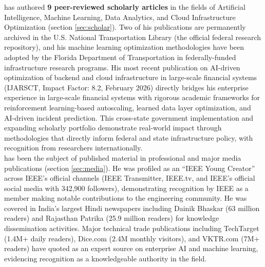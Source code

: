 \dr has authored \textbf{9 peer-reviewed scholarly articles} in the fields of Artificial Intelligence, Machine Learning, Data Analytics, and Cloud Infrastructure Optimization (section \ref{sec:scholar}). Two of his publications are permanently archived in the U.S. National Transportation Library (the official federal research repository), and his machine learning optimization methodologies have been adopted by the Florida Department of Transportation in federally-funded infrastructure research programs. His most recent publication on AI-driven optimization of backend and cloud infrastructure in large-scale financial systems (IJARSCT, Impact Factor: 8.2, February 2026) directly bridges his enterprise experience in large-scale financial systems with rigorous academic frameworks for reinforcement learning-based autoscaling, learned data layer optimization, and AI-driven incident prediction. This cross-state government implementation and expanding scholarly portfolio demonstrate real-world impact through methodologies that directly inform federal and state infrastructure policy, with recognition from researchers internationally.\\

\dr has been the subject of published material in professional and major media publications (section \ref{sec:media}). He was profiled as an ``IEEE Young Creator'' across IEEE's official channels (IEEE Transmitter, IEEE.tv, and IEEE's official social media with 342,900 followers), demonstrating recognition by IEEE as a member making notable contributions to the engineering community. He was covered in India's largest Hindi newspapers including Dainik Bhaskar (63 million readers) and Rajasthan Patrika (25.9 million readers) for knowledge dissemination activities. Major technical trade publications including TechTarget (1.4M+ daily readers), Dice.com (2.4M monthly visitors), and VKTR.com (7M+ readers) have quoted \dr as an expert source on enterprise AI and machine learning, evidencing recognition as a knowledgeable authority in the field.\\


